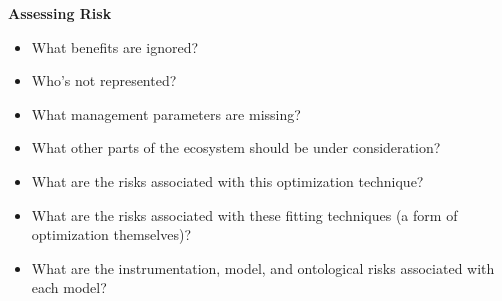 \documentclass[11pt,a5paper]{book}
\begin{document}
\noindent \textbf{Assessing Risk}
\begin{itemize}
\item What benefits are ignored?
\item Who's not represented?
\item What management parameters are missing?
\item What other parts of the ecosystem should be under consideration?
\item What are the risks associated with this optimization technique?
\item What are the risks associated with these fitting techniques (a form of optimization themselves)?
\item What are the instrumentation, model, and ontological risks associated with each model?
\end{itemize}
\end{document}
